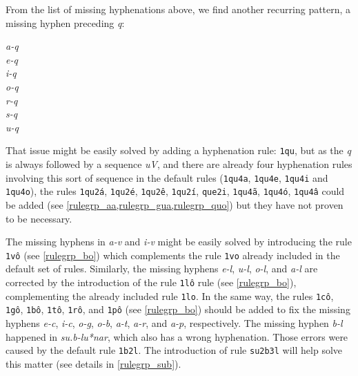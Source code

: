 From the list of missing hyphenations above, we find another recurring pattern, a missing hyphen preceding \emph{q}: 
\begin{multicols}{5}
\setlength{\columnsep}{0pt}
\setlength{\parindent}{0pt}
\emph{a-q \\ e-q \\ i-q \\ o-q \\ r-q \\ s-q \\ u-q}
\end{multicols}
That issue might be easily solved by adding a hyphenation rule: \texttt{1qu}, but as the \emph{q} is always followed by 
a sequence \emph{uV}, and there are already four hyphenation rules involving this sort of sequence in the default rules
(\texttt{1qu4a}, \texttt{1qu4e}, \texttt{1qu4i} and \texttt{1qu4o}), the rules 
\texttt{1qu2á}, \texttt{1qu2é}, \texttt{1qu2ê}, \texttt{1qu2í}, \texttt{que2i}, \texttt{1qu4ã}, \texttt{1qu4ó}, \texttt{1qu4â}
could be added (see \cref{rulegrp_aa,rulegrp_gua,rulegrp_quo}) but they have not proven to be necessary.

The missing hyphens in \emph{a-v} and \emph{i-v} might be easily solved by introducing the rule \texttt{1vô} (see \cref{rulegrp_bo}) which 
complements the rule \texttt{1vo} already included in the default set of rules.
Similarly, the missing hyphens \emph{e-l}, \emph{u-l}, \emph{o-l}, and \emph{a-l} are corrected by the introduction of the rule \texttt{1lô} rule (see \cref{rulegrp_bo}),
complementing the already included rule \texttt{1lo}.
In the same way, the rules \texttt{1cô}, \texttt{1gô}, \texttt{1bô}, \texttt{1tô}, \texttt{1rô}, and \texttt{1pô} (see \cref{rulegrp_bo}) 
should be added to fix the missing hyphens \emph{e-c}, \emph{i-c}, \emph{o-g}, \emph{o-b}, \emph{a-t}, \emph{a-r},
and \emph{a-p}, respectively.
%
The missing hyphen \emph{b-l} happened in \emph{su.b-lu*nar}, which also has a wrong hyphenation.
Those errors were caused by the default rule \texttt{1b2l}. The introduction of rule \texttt{su2b3l} 
will help solve this matter (see details in \cref{rulegrp_sub}).

